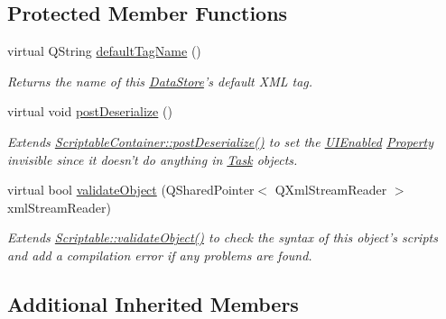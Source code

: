\subsection*{Protected Member Functions}
\begin{DoxyCompactItemize}
\item 
virtual Q\-String \hyperlink{class_picto_1_1_task_a1a4c648ccf8389bc35b3785527e0213b}{default\-Tag\-Name} ()
\begin{DoxyCompactList}\small\item\em Returns the name of this \hyperlink{class_picto_1_1_data_store}{Data\-Store}'s default X\-M\-L tag. \end{DoxyCompactList}\item 
\hypertarget{class_picto_1_1_task_a4709ec0c131f873b026ef40b49792863}{virtual void \hyperlink{class_picto_1_1_task_a4709ec0c131f873b026ef40b49792863}{post\-Deserialize} ()}\label{class_picto_1_1_task_a4709ec0c131f873b026ef40b49792863}

\begin{DoxyCompactList}\small\item\em Extends \hyperlink{class_picto_1_1_scriptable_container_a0654af2c08f9a6c967a21b57614950ba}{Scriptable\-Container\-::post\-Deserialize()} to set the \hyperlink{class_picto_1_1_u_i_enabled}{U\-I\-Enabled} \hyperlink{class_picto_1_1_property}{Property} invisible since it doesn't do anything in \hyperlink{class_picto_1_1_task}{Task} objects. \end{DoxyCompactList}\item 
\hypertarget{class_picto_1_1_task_a453654d7c802d3c2bd37041643bf0616}{virtual bool \hyperlink{class_picto_1_1_task_a453654d7c802d3c2bd37041643bf0616}{validate\-Object} (Q\-Shared\-Pointer$<$ Q\-Xml\-Stream\-Reader $>$ xml\-Stream\-Reader)}\label{class_picto_1_1_task_a453654d7c802d3c2bd37041643bf0616}

\begin{DoxyCompactList}\small\item\em Extends \hyperlink{class_picto_1_1_scriptable_ab6e2944c43a3b5d418bf7b251594386d}{Scriptable\-::validate\-Object()} to check the syntax of this object's scripts and add a compilation error if any problems are found. \end{DoxyCompactList}\end{DoxyCompactItemize}
\subsection*{Additional Inherited Members}


